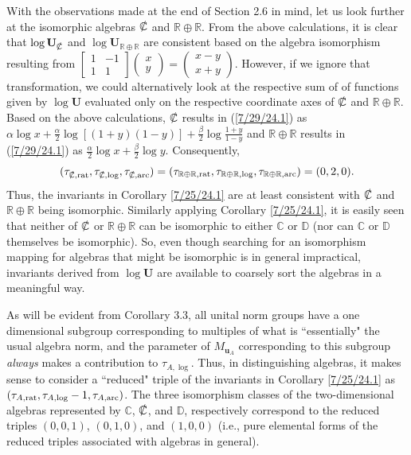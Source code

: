 \documentclass{amsart}
\numberwithin{equation}{section}
\theoremstyle{definition}
\numberwithin{theorem}{section}
\begin{document}
With the observations made at the end of Section 2.6 in mind, let us look further at the isomorphic algebras $\slashed{\mathbb{C}}$ and $\mathbb{R}\oplus\mathbb{R}$.  From the above calculations, it is clear that $\log\mathbf{U}_{\slashed{\mathbb{C}}}$ and $\log\mathbf{U}_{\mathbb{R}\oplus\mathbb{R}}$ are consistent based on the algebra isomorphism resulting from $\left[\begin{array}{ccc}
 1 & -1   \\ 
 1 & 1    
\end{array}\right]\left(\begin{array}{ccc}
x   \\ 
y   
\end{array}\right) = \left(\begin{array}{ccc}
x-y   \\ 
x+y   
\end{array}\right)$.  However, if we ignore that transformation, we could alternatively look at the respective sum of of functions given by $\log\mathbf{U}$ evaluated only on the respective coordinate axes of $\slashed{\mathbb{C}}$ and $\mathbb{R}\oplus\mathbb{R}$.  Based on the above calculations, $\slashed{\mathbb{C}}$ results in (\ref{7/29/24.1}) as $\alpha\log x+ \frac{\alpha}{2}\log[(1+
y)(1-y)] +  \frac{\beta}{2}\log \frac{1+y}{1-y}$ and $\mathbb{R}\oplus\mathbb{R}$ results in (\ref{7/29/24.1}) as $\frac{\alpha}{2}\log x +\frac{\beta}{2} \log y$. Consequently,  \[(\tau_{\slashed{\mathbb{C}},{\rm rat}},\tau_{\slashed{\mathbb{C}},{\rm log}},\tau_{\slashed{\mathbb{C}},{\rm arc}}) = (\tau_{\mathbb{R}\oplus\mathbb{R},{\rm rat}},\tau_{\mathbb{R}\oplus\mathbb{R},{\rm log}},\tau_{\mathbb{R}\oplus\mathbb{R},{\rm arc}}) = (0,2,0). \] Thus, the invariants in Corollary \ref{7/25/24.1} are at least consistent with $\slashed{\mathbb{C}}$ and $\mathbb{R}\oplus\mathbb{R}$ being isomorphic.  Similarly applying Corollary \ref{7/25/24.1}, it is easily seen that neither of $\slashed{\mathbb{C}}$ or $\mathbb{R}\oplus\mathbb{R}$ can be isomorphic to either $\mathbb{C}$ or $\mathbb{D}$ (nor can  $\mathbb{C}$ or $\mathbb{D}$ themselves be isomorphic).   So, even though searching for an isomorphism mapping for algebras that might be isomorphic is in general impractical, invariants derived from $\log\mathbf{U}$ are available to coarsely sort the algebras in a meaningful way.

As will be evident from Corollary 3.3, all unital norm groups have a one dimensional subgroup corresponding to multiples of what is ``essentially" the usual algebra norm, and the parameter of $M_{\mathbf{u}_A}$ corresponding to this subgroup {\it always} makes a contribution to $\tau_{A,\log}$.  Thus, in distinguishing algebras, it makes sense to consider a ``reduced" triple of the invariants in Corollary \ref{7/25/24.1} as $(\tau_{A,{\rm rat}},\tau_{A,{\rm log}}-1,\tau_{A,{\rm arc}})$.  The three isomorphism classes of the two-dimensional algebras represented by $\mathbb{C}$, $\slashed{\mathbb{C}}$, and $\mathbb{D}$, respectively correspond to the reduced triples $(0,0,1)$, $(0,1,0)$, and $(1,0,0)$ (i.e., pure elemental forms of the reduced triples associated with algebras in general).
   
\end{document}
